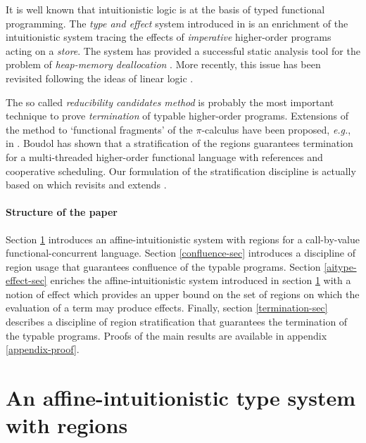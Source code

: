 \documentclass[11pt]{article}
\begin{document}
It is well known that intuitionistic logic is at the basis of typed
functional programming.  The {\em type and effect} system introduced
in \cite{LG88} is an enrichment of the intuitionistic system tracing
the effects of {\em imperative} higher-order programs acting on a {\em store}.  
The system has provided a successful static analysis tool
for the problem of {\em heap-memory deallocation} \cite{TT97}. 
More recently, this issue has been  revisited following the ideas of 
linear logic \cite{WW01,FMA06} .

The so called {\em reducibility candidates method} is probably the most
important technique to prove {\em termination} of typable higher-order
programs.  Extensions of the method to `functional fragments' of the
$\pi$-calculus have been proposed, {\em e.g.}, in \cite{YBH04,S06}.
Boudol \cite{Boudol07} has shown that a stratification of the regions
guarantees termination for a multi-threaded higher-order functional language 
with references and cooperative scheduling. 
Our formulation of the stratification discipline is actually based on \cite{Amadio09} 
which revisits and extends \cite{Boudol07}.



\paragraph{Structure of the paper}
Section \ref{aitype-sec} introduces an affine-intuitionistic system with regions
for a call-by-value functional-concurrent language.
Section \ref{confluence-sec} introduces a discipline of region usage that guarantees
confluence of the typable programs.
Section \ref{aitype-effect-sec} enriches the affine-intuitionistic system introduced
in section \ref{aitype-sec} with a notion of effect which provides an upper bound
on the set of regions on which the evaluation of a term may produce effects.
Finally, section \ref{termination-sec} describes a discipline of region stratification
that guarantees the termination of the typable programs.
Proofs of the main results are available in appendix \ref{appendix-proof}.

\section{An affine-intuitionistic type system with regions}\label{aitype-sec}
\end{document}
